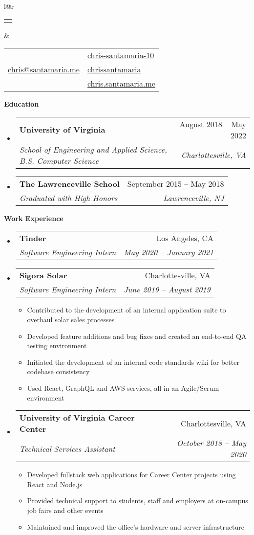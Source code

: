 \documentclass[letterpaper,12pt]{article}[leftmargin=*]
\makeatletter
\def \fullname {Chris Santamaria}
\def \linkedinicon {\faLinkedinSquare}
\def \linkedinlink {https://www.linkedin.com/in/chris-santamaria-10}
\def \linkedintext {chris-santamaria-10}
\def \phoneicon {\faPhone}
\def \phonetext {(813) 545-5164}
\def \emailicon {\faEnvelope}
\def \emaillink {mailto:chris@santamaria.me}
\def \emailtext {chris@santamaria.me}
\def \locationicon {\faMapMarker}
\def \locationtext {Saint Petersburg, FL}
\def \githubicon {\faGithub}
\def \githublink {https://github.com/chrissantamaria}
\def \githubtext {chrissantamaria}
\def \websiteicon {\faGlobe}
\def \websitelink {https://chris.santamaria.me}
\def \websitetext {chris.santamaria.me}
\def \headertype {\doublecol} %
\def \entryspacing {-0pt}
\def \linkedin {\linkedinicon \hspace{3pt}\href{\linkedinlink}{\linkedintext}}
\def \phone {\phoneicon \hspace{3pt}{ \phonetext}}
\def \email {\emailicon \hspace{4pt}\href{\emaillink}{\emailtext}}
\def \location {\hspace{0pt} \locationicon \hspace{2pt}{ \locationtext}}
\def \github {\githubicon \hspace{3pt}\href{\githublink}{\githubtext}}
\def \website {\websiteicon \hspace{3pt}\href{\websitelink}{\websitetext}}
\renewcommand{\section}[2]{\vspace{5pt}
  \colorbox{secondary}{\color{white}\raggedbottom\normalsize\textbf{{#1}{\hspace{7pt}#2}}}
}
\newcommand{\resumeEntryStart}{\begin{itemize}[leftmargin=2.5mm]}
\newcommand{\resumeEntryEnd}{\end{itemize}\vspace{\entryspacing}}
\newcommand{\resumeItemListStart}{\begin{itemize}[leftmargin=4.5mm]}
\newcommand{\resumeItemListEnd}{\end{itemize}}
\newcommand{\resumeItem}[1]{
  \item\small{
    {#1 \vspace{-2pt}}
  }
}
\newcommand{\resumeEntryTSDL}[4]{
  \vspace{-1pt}\item[]
    \begin{tabular*}{0.97\textwidth}{l@{\extracolsep{\fill}}r}
      \textbf{\color{primary}#1} & {\firabook\color{accent}\small#2} \\
      \textit{\color{accent}\small#3} & \textit{\color{accent}\small#4} \\
    \end{tabular*}\vspace{-7pt}
}
\newcommand{\doublecol}[6]{
  \begin{tabular*}{\textwidth}{l@{\extracolsep{\fill}}r}
    {
      \begin{tabular}[c]{l}
        \fontsize{35}{45}\selectfont{\color{primary}{{\textbf{\fullname}}}}
      \end{tabular}
    } & {
      \begin{tabular}[c]{l@{\hspace{1.5em}}l}
        {\small#4} & {\small#1} \\
        {\small#5} & {\small#2} \\
        {\small#6} & {\small#3}
      \end{tabular}
    }
  \end{tabular*}
}
\newcommand{\singlecol}[6]{
  \begin{tabular*}{\textwidth}{l@{\extracolsep{\fill}}r}
    {
      \begin{tabular}[b]{l}
        \fontsize{35}{45}\selectfont{\color{primary}{{\textbf{\fullname}}}} \\
        {\textit{\subtitle}} %
      \end{tabular}
    } & {
      \begin{tabular}[c]{l}
        {\small#1} \\
        {\small#2} \\
        {\small#3} \\
        {\small#4} \\
        {\small#5} \\
        {\small#6}
      \end{tabular}
    }
  \end{tabular*}
}
\makeatother
\begin{document}


\headertype{\linkedin}{\github}{\website}{\phone}{\email}{\location} %
\vspace{0pt} %

\section{\faGraduationCap}{Education}

  \resumeEntryStart
    \resumeEntryTSDL
      {University of Virginia}{August 2018 -- May 2022}
      {School of Engineering and Applied Science, B.S. Computer Science}{Charlottesville, VA}
  \resumeEntryEnd
  \resumeEntryStart
  \resumeEntryTSDL
    {The Lawrenceville School}{September 2015 -- May 2018}
    {Graduated with High Honors}{Lawrenceville, NJ}
  \resumeEntryEnd

\section{\faCode}{Work Experience}

  \resumeEntryStart
    \resumeEntryTSDL
      {Tinder}{Los Angeles, CA}
      {Software Engineering Intern}{May 2020 -- January 2021}
  \resumeEntryEnd

  \resumeEntryStart
    \resumeEntryTSDL
      {Sigora Solar}{Charlottesville, VA}
      {Software Engineering Intern}{June 2019 -- August 2019}
    \resumeItemListStart
      \resumeItem {Contributed to the development of an internal application suite to overhaul solar sales processes}
      \resumeItem {Developed feature additions and bug fixes and created an end-to-end QA testing environment}
      \resumeItem {Initiated the development of an internal code standards wiki for better codebase consistency}
      \resumeItem {Used React, GraphQL and AWS services, all in an Agile/Scrum environment}
    \resumeItemListEnd
  \resumeEntryEnd

  \resumeEntryStart
    \resumeEntryTSDL
      {University of Virginia Career Center}{Charlottesville, VA}
      {Technical Services Assistant}{October 2018 -- May 2020}
    \resumeItemListStart
      \resumeItem {Developed fullstack web applications for Career Center projects using React and Node.js}
      \resumeItem {Provided technical support to students, staff and employers at on-campus job fairs and other events}
      \resumeItem {Maintained and improved the office’s hardware and server infrastructure}
    \resumeItemListEnd
  \resumeEntryEnd
\end{document}
